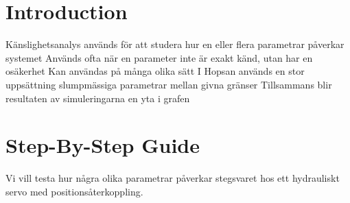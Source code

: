 \documentclass[a4paper,pdftex]{article}
\begin{document}

\section*{Introduction}
Känslighetsanalys används för att studera hur en eller flera parametrar påverkar systemet
Används ofta när en parameter inte är exakt känd, utan har en osäkerhet
Kan användas på många olika sätt
I Hopsan används en stor uppsättning slumpmässiga parametrar mellan givna gränser
Tillsammans blir resultaten av simuleringarna en yta i grafen

\section*{Step-By-Step Guide}
Vi vill testa hur några olika parametrar påverkar stegsvaret hos ett hydrauliskt servo med positionsåterkoppling.
\end{document}

